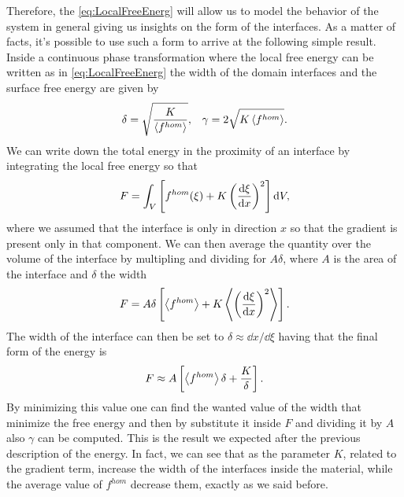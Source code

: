Therefore, the \eqref{eq:LocalFreeEnerg} will allow us to model the behavior of the system in general giving us insights on the form of the interfaces. As a matter of facts, it's possible to use such a form to arrive at the following simple result.
{
    Inside a continuous phase transformation where the local free energy can be written as in \eqref{eq:LocalFreeEnerg} the width of the domain interfaces and the surface free energy are given by
    \begin{align}
        &\delta = \sqrt{\frac{K}{\left\langle f^{hom} \right\rangle}}, &\gamma = 2\sqrt{K\left\langle f^{hom} \right\rangle}.
    \end{align}
}
{
    We can write down the total energy in the proximity of an interface by integrating the local free energy so that
    \begin{equation}
        F = \int_V \left[ f^{hom}(\xi) + K\left( \dv{\xi}{x} \right)^2 \right]\dd V,
    \end{equation}
    where we assumed that the interface is only in direction $x$ so that the gradient is present only in that component. We can then average the quantity over the volume of the interface by multipling and dividing for $A\delta$, where $A$ is the area of the interface and $\delta$ the width
    \begin{equation}
        F = A\delta\left[ \left\langle f^{hom} \right\rangle + K \left\langle \left( \dv{\xi}{x} \right)^2 \right\rangle \right].
    \end{equation}
    The width of the interface can then be set to $\delta \approx \dd x/\dd\xi$ having that the final form of the energy is
    \begin{equation}
        F \approx A\left[ \left\langle f^{hom} \right\rangle\delta + \frac{K}{\delta} \right].
    \end{equation}
    By minimizing this value one can find the wanted value of the width that minimize the free energy and then by substitute it inside $F$ and dividing it by $A$ also $\gamma$ can be computed.
}
\noindent
This is the result we expected after the previous description of the energy. In fact, we can see that as the parameter $K$, related to the gradient term, increase the width of the interfaces inside the material, while the average value of $f^{hom}$ decrease them, exactly as we said before.

